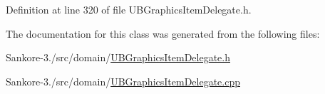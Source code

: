 Definition at line 320 of file U\-B\-Graphics\-Item\-Delegate.\-h.



The documentation for this class was generated from the following files\-:\begin{DoxyCompactItemize}
\item 
Sankore-\/3./src/domain/\hyperlink{_u_b_graphics_item_delegate_8h}{U\-B\-Graphics\-Item\-Delegate.\-h}\item 
Sankore-\/3./src/domain/\hyperlink{_u_b_graphics_item_delegate_8cpp}{U\-B\-Graphics\-Item\-Delegate.\-cpp}\end{DoxyCompactItemize}
